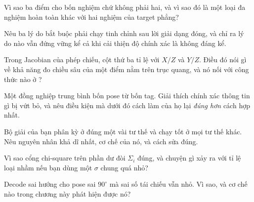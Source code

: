 \documentclass[../../marker.tex]{subfiles}
\begin{document}
\begin{tukiem}
\item Vì sao ba điểm cho bốn nghiệm chứ không phải hai, và vì sao đó là một loại đa nghiệm hoàn toàn khác với hai nghiệm của target phẳng?
\item Nêu ba lý do bắt buộc phải chạy tinh chỉnh sau lời giải dạng đóng, và chỉ ra lý do nào vẫn đứng vững kể cả khi cải thiện độ chính xác là không đáng kể.
\item Trong Jacobian của phép chiếu, cột thứ ba tỉ lệ với \(X/Z\) và \(Y/Z\). Điều đó nói gì về khả năng đo chiều sâu của một điểm nằm trên trục quang, và nó nối với công thức nào ở ?
\item Một đồng nghiệp trung bình bốn pose từ bốn tag. Giải thích chính xác thông tin gì bị vứt bỏ, và nêu điều kiện mà dưới đó cách làm của họ lại \emph{đúng hơn} cách hợp nhất.
\item Bộ giải của bạn phân kỳ ở đúng một vài tư thế và chạy tốt ở mọi tư thế khác. Nêu nguyên nhân khả dĩ nhất, cơ chế của nó, và cách sửa đúng.
\item Vì sao cổng chi-square trên phần dư đòi \(\Sigma_i\) đúng, và chuyện gì xảy ra với tỉ lệ loại nhầm nếu bạn dùng một \(\sigma\) chung quá nhỏ?
\item Decode sai hướng cho pose sai \(90^\circ\) mà sai số tái chiếu vẫn nhỏ. Vì sao, và cơ chế nào trong chương này phát hiện được nó?
\end{tukiem}
\ifSubfilesClassLoaded{\printbibliography[title={Nguồn}]}{}
\end{document}
